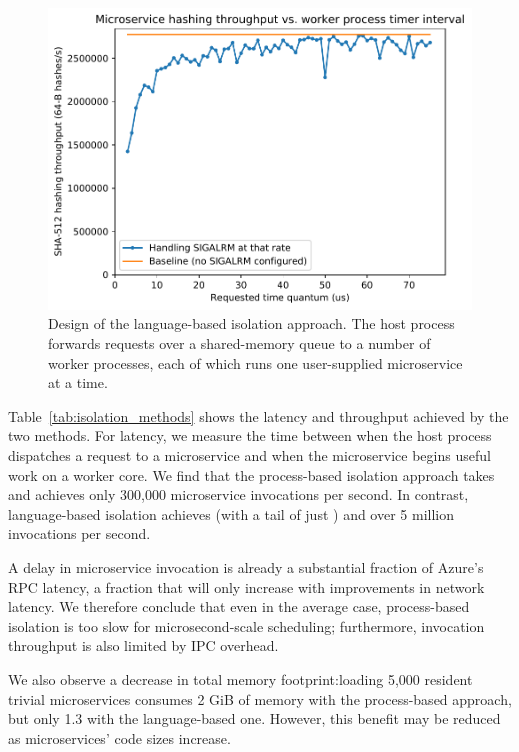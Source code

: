 \begin{figure}
\includegraphics[width=\columnwidth]{figs/system}
\caption{Design of the language-based isolation approach.  The host process forwards
requests over a shared-memory queue to a number of worker processes, each of which
runs one user-supplied microservice at a time.}
\label{fig:sysdesign}
\end{figure}

Table~\ref{tab:isolation_methods} shows the latency and throughput achieved
by the two methods. For latency, we measure the time between when the host
process dispatches a request to a microservice and when the microservice begins
useful work on a worker core. We find that the process-based isolation approach
takes  and achieves only 300,000 microservice invocations per
second. In contrast, language-based isolation achieves  (with a tail
of just ) and over 5 million invocations per second.

A  delay in microservice invocation is already a substantial fraction of
Azure's  RPC latency, a fraction that will only increase with
improvements in network latency. We therefore conclude that even in the average case,
process-based isolation is too slow for microsecond-scale scheduling; furthermore,
invocation throughput is also limited by IPC overhead.

We also observe a decrease in total memory footprint:\@ loading 5,000 resident
trivial microservices consumes 2 GiB of memory with the process-based approach, but
only 1.3 with the language-based one.  However, this benefit may be reduced as
microservices' code sizes increase.


